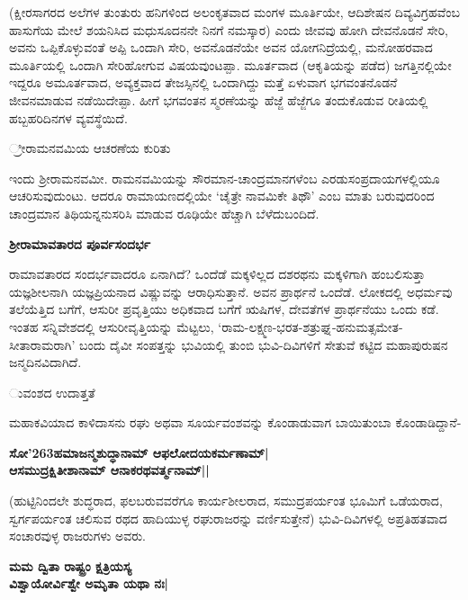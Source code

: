(ಕ್ಷೀರಸಾಗರದ ಅಲೆಗಳ ತುಂತುರು ಹನಿಗಳಿಂದ ಅಲಂಕೃತವಾದ ಮಂಗಳ ಮೂರ್ತಿಯೇ, ಆದಿಶೇಷನ ದಿವ್ಯವಿಗ್ರಹವೆಂಬ ಹಾಸುಗೆಯ ಮೇಲೆ ಶಯನಿಸಿದ ಮಧುಸೂದನನೇ ನಿನಗೆ ನಮಸ್ಕಾರ) ಎಂದು ಜೀವವು ಹೋಗಿ ದೇವನೊಡನೆ ಸೇರಿ, ಅವನು ಒಪ್ಪಿಕೊಳ್ಳುವಂತೆ ಅಪ್ಪಿ ಒಂದಾಗಿ ಸೇರಿ, ಅವನೊಡನೆಯೇ ಅವನ ಯೋಗನಿದ್ರೆಯಲ್ಲಿ, ಮನೋಹರವಾದ ಮೂರ್ತಿಯಲ್ಲಿ ಒಂದಾಗಿ ಸೇರಿಹೋಗುವ ವಿಷಯವುಂಟಪ್ಪಾ. ಮೂರ್ತವಾದ (ಆಕೃತಿಯನ್ನು ಪಡೆದ) ಜಗತ್ತಿನಲ್ಲಿಯೇ ಇದ್ದರೂ ಅಮೂರ್ತವಾದ, ಅವ್ಯಕ್ತವಾದ ತೇಜಸ್ಸಿನಲ್ಲಿ ಒಂದಾಗಿದ್ದು ಮತ್ತೆ ಏಳುವಾಗ ಭಗವಂತನೊಡನೆ ಜೀವನಮಾಡುವ ನಡೆಯಿದೇಪ್ಪಾ. ಹೀಗೆ ಭಗವಂತನ ಸ್ಮರಣೆಯನ್ನು ಹೆಜ್ಜೆ ಹೆಜ್ಜೆಗೂ ತಂದುಕೊಡುವ ರೀತಿಯಲ್ಲಿ ಹಬ್ಬಹರಿದಿನಗಳ ವ್ಯವಸ್ಥೆಯಿದೆ. 


\large{್ರೀರಾಮನವಮಿಯ ಆಚರಣೆಯ ಕುರಿತು} 


ಇಂದು ಶ್ರೀರಾಮನವಮೀ. ರಾಮನವಮಿಯನ್ನು ಸೌರಮಾನ-ಚಾಂದ್ರಮಾನಗಳೆಂಬ ಎರಡುಸಂಪ್ರದಾಯಗಳಲ್ಲಿಯೂ ಆಚರಿಸುವುದುಂಟು. ಆದರೂ ರಾಮಾಯಣದಲ್ಲಿಯೇ `ಚೈತ್ರೇ ನಾವಮಿಕೇ ತಿಥೌ' ಎಂಬ ಮಾತು ಬರುವುದರಿಂದ ಚಾಂದ್ರಮಾನ ತಿಥಿಯನ್ನನುಸರಿಸಿ ಮಾಡುವ ರೂಢಿಯೇ ಹೆಚ್ಚಾಗಿ ಬೆಳೆದುಬಂದಿದೆ. 


\large{\bf{ಶ್ರೀರಾಮಾವತಾರದ ಪೂರ್ವಸಂದರ್ಭ}} 


ರಾಮಾವತಾರದ ಸಂದರ್ಭವಾದರೂ ಏನಾಗಿದೆ? ಒಂದೆಡೆ ಮಕ್ಕಳಿಲ್ಲದ ದಶರಥನು ಮಕ್ಕಳಿಗಾಗಿ ಹಂಬಲಿಸುತ್ತಾ ಯಜ್ಞಶೀಲನಾಗಿ ಯಜ್ಞಪ್ರಿಯನಾದ ವಿಷ್ಣುವನ್ನು ಆರಾಧಿಸುತ್ತಾನೆ. ಅವನ ಪ್ರಾರ್ಥನೆ ಒಂದೆಡೆ. ಲೋಕದಲ್ಲಿ ಅಧರ್ಮವು ತಲೆಯೆತ್ತಿದ ಬಗೆಗೆ, ಆಸುರೀ ಪ್ರವೃತ್ತಿಯು ಅಧಿಕವಾದ ಬಗೆಗೆ ಋಷಿಗಳ, ದೇವತೆಗಳ ಪ್ರಾರ್ಥನೆಯು ಒಂದು ಕಡೆ. ಇಂತಹ ಸನ್ನಿವೇಶದಲ್ಲಿ ಆಸುರೀವೃತ್ತಿಯನ್ನು ಮೆಟ್ಟಲು, `ರಾಮ-ಲಕ್ಷ್ಮಣ-ಭರತ-ಶತ್ರುಘ್ನ-ಹನುಮತ್ಸಮೇತ-ಸೀತಾರಾಮರಾಗಿ' ಬಂದು ದೈವೀ ಸಂಪತ್ತನ್ನು ಭುವಿಯಲ್ಲಿ ತುಂಬಿ ಭುವಿ-ದಿವಿಗಳಿಗೆ ಸೇತುವೆ ಕಟ್ಟಿದ ಮಹಾಪುರುಷನ ಜನ್ಮದಿನವಿದಾಗಿದೆ. 


\large{ುವಂಶದ ಉದಾತ್ತತೆ} 


ಮಹಾಕವಿಯಾದ ಕಾಳಿದಾಸನು ರಘು ಅಥವಾ ಸೂರ್ಯವಂಶವನ್ನು ಕೊಂಡಾಡುವಾಗ ಬಾಯಿತುಂಬಾ ಕೊಂಡಾಡಿದ್ದಾನೆ- 


\begin{center} 

{\bf ಸೋ\char'263ಹಮಾಜನ್ಮಶುದ್ಧಾನಾಮ್‍ ಆಫಲೋದಯಕರ್ಮಣಾಮ್‍|\\ 

ಆಸಮುದ್ರಕ್ಷಿತೀಶಾನಾಮ್‍ ಆನಾಕರಥವರ್ತ್ಮನಾಮ್‍||} 

\end{center} 


(ಹುಟ್ಟಿನಿಂದಲೇ ಶುದ್ಧರಾದ, ಫಲಬರುವವರೆಗೂ ಕಾರ್ಯಶೀಲರಾದ, ಸಮುದ್ರಪರ್ಯಂತ ಭೂಮಿಗೆ ಒಡೆಯರಾದ, ಸ್ವರ್ಗಪರ್ಯಂತ ಚಲಿಸುವ ರಥದ ಹಾದಿಯುಳ್ಳ ರಘುರಾಜರನ್ನು ವರ್ಣಿಸುತ್ತೇನೆ) ಭುವಿ-ದಿವಿಗಳಲ್ಲಿ ಅಪ್ರತಿಹತವಾದ ಸಂಚಾರವುಳ್ಳ ರಾಜರುಗಳು ಅವರು. 


\begin{center} 

{\bf ಮಮ ದ್ವಿತಾ ರಾಷ್ಟ್ರಂ ಕ್ಷತ್ರಿಯಸ್ಯ\\ 

ವಿಶ್ವಾಯೋರ್ವಿಶ್ವೇ ಅಮೃತಾ ಯಥಾ ನಃ|} 

\end{center} 


